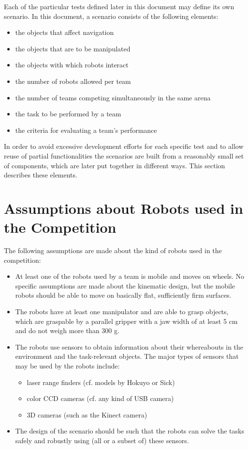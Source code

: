 
Each of the particular tests defined later in this document may define its own scenario. In this document, a scenario consists of the following elements:

\begin{itemize}
	\item the objects that affect navigation
	\item the objects that are to be manipulated
	\item the objects with which robots interact
	\item the number of robots allowed per team
	\item the number of teams competing simultaneously in the same arena
	\item the task to be performed by a team
	\item the criteria for evaluating a team’s performance
\end{itemize}

In order to avoid excessive development efforts for each specific test and to allow reuse of partial functionalities the scenarios are built from a reasonably small set of components, which are later put together in different ways. This section describes these elements.

\section{Assumptions about Robots used in the Competition}

The following assumptions are made about the kind of robots used in the competition:

\begin{itemize}

	\item At least one of the robots used by a team is mobile and moves on wheels. No specific assumptions are made about the kinematic design, but the mobile robots should be able to move on basically flat, sufficiently firm surfaces.
	\item The robots have at least one manipulator and are able to grasp objects, which are graspable by a parallel gripper with a jaw width of at least 5 cm and do not weigh more than 300 g.
	\item The robots use sensors to obtain information about their whereabouts in the environment and the task-relevant objects. The major types of sensors that may be used by the robots include:
	\begin{itemize}
		\item laser range finders (cf. models by Hokuyo or Sick)
		\item color CCD cameras (cf. any kind of USB camera)
		\item 3D cameras (such as the Kinect camera)
	\end{itemize}

	\item The design of the scenario should be such that the robots can solve the 	tasks safely and robustly using (all or a subset of) these sensors.

\end{itemize}



